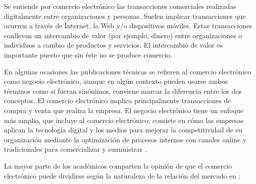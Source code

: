 \vspace{-1cm}

Se entiende por comercio electrónico las transacciones comerciales realizadas digitalmente entre organizaciones y personas. Suelen implicar transacciones que ocurren a través de Internet, la Web y/o dispositivos móviles. Estas transacciones conllevan un intercambio de valor (por ejemplo, dinero) entre organizaciones o individuos a cambio de productos y servicios. El intercambio de valor es importante puesto que sin éste no se produce comercio.

En algunas ocasiones las publicaciones técnicas se refieren al comercio electrónico como negocio electrónico, aunque en algún contexto pueden usarse ambos términos como si fueran sinónimos, conviene marcar la diferencia entre los dos conceptos. El comercio electrónico implica principalmente transacciones de compra y venta que realiza la empresa. El negocio electrónico tiene un enfoque más amplio, que incluye al comercio electrónico, consiste en cómo las empresas aplican la tecnología digital y los medios para mejorar la competitividad de su organización mediante la optimización de procesos internos con canales online y tradicionales para comercializar y suministrar \cite{DigitalBusiness}.

La mayor parte de los académicos comparten la opinión de que el comercio electrónico puede dividirse según la naturaleza de la relación del mercado en \cite{E-commerce2016}:

